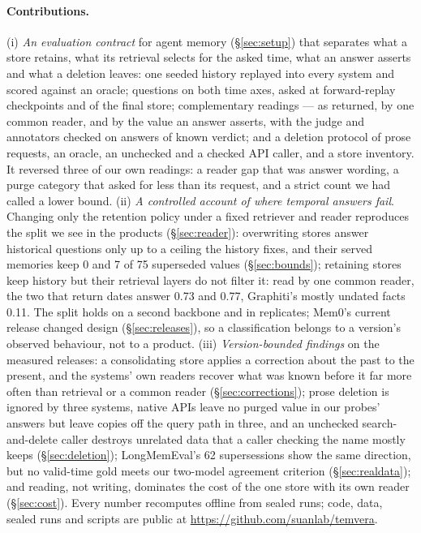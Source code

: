 \documentclass[conference]{IEEEtran}
\begin{document}
\paragraph{Contributions.}
(i) \emph{An evaluation contract} for agent memory (\S\ref{sec:setup}) that
separates what a store retains, what its retrieval selects for the asked time,
what an answer asserts and what a deletion leaves: one seeded history replayed
into every system and scored against an oracle; questions on both time axes,
asked at forward-replay checkpoints and of the final store; complementary
readings --- as returned, by one common reader, and by the value an answer
asserts, with the judge and annotators checked on answers of known verdict; and a deletion
protocol of prose requests, an oracle, an unchecked and a checked API caller,
and a store inventory. It reversed three of our own readings: a reader gap that
was answer wording, a purge category that asked for less than its request, and
a strict count we had called a lower bound.
(ii) \emph{A controlled account of where temporal answers fail}. Changing only
the retention policy under a fixed retriever and reader reproduces the split we
see in the products (\S\ref{sec:reader}): overwriting stores answer historical
questions only up to a ceiling the history fixes, and their served memories
keep 0 and 7 of 75 superseded values (\S\ref{sec:bounds}); retaining stores
keep history but their retrieval layers do not filter it: read by one common
reader, the two that return dates answer 0.73 and 0.77, Graphiti's mostly
undated facts 0.11. The split
holds on a second backbone and in replicates; Mem0's current release changed
design (\S\ref{sec:releases}), so a classification belongs to a version's
observed behaviour, not to a product.
(iii) \emph{Version-bounded findings} on the measured releases: a consolidating
store applies a correction about the past to the present, and the systems' own
readers recover what was known before it far more often than retrieval or a
common reader (\S\ref{sec:corrections}); prose deletion is ignored by three
systems, native APIs leave no purged value in our probes' answers but leave
copies off the query path in three, and an unchecked search-and-delete caller
destroys unrelated data that a caller checking the name mostly keeps
(\S\ref{sec:deletion}); LongMemEval's 62 supersessions show the same direction,
but no valid-time gold meets our two-model agreement criterion
(\S\ref{sec:realdata}); and reading, not writing, dominates the cost of the
one store with its own reader (\S\ref{sec:cost}).
Every number recomputes offline from sealed runs; code, data, sealed runs and
scripts are public at
\url{https://github.com/suanlab/temvera}.
\end{document}

